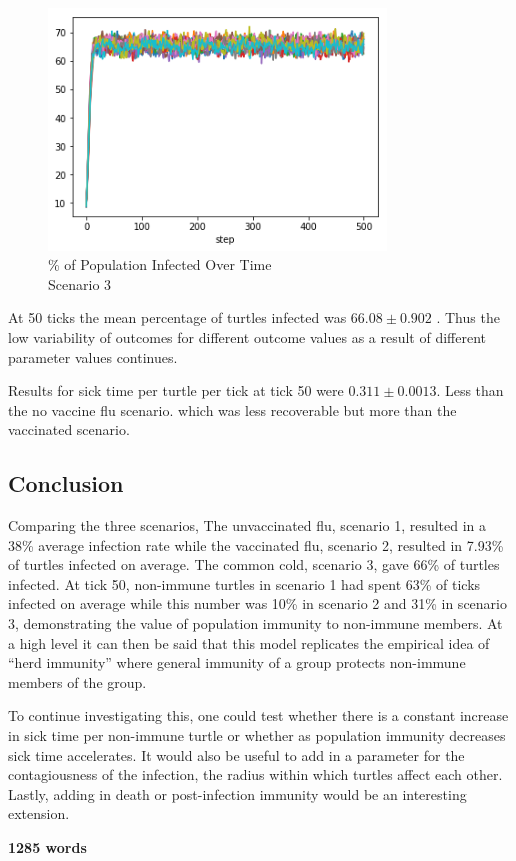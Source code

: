 \documentclass[11pt]{article} %
\begin{document}
\begin{figure}
\centering
\includegraphics[width=0.8\textwidth]{20-runs-scenario-3-steady-state}
\caption{\% of Population Infected Over Time \\ Scenario 3}
\end{figure}


At 50 ticks the mean percentage of turtles infected was $66.08 \pm 0.902$ . Thus the low variability of outcomes for different outcome values as a result of different parameter values continues. 

Results for sick time per turtle per tick at tick 50 were $0.311 \pm 0.0013$. Less than the no vaccine flu scenario. which was less recoverable but more than the vaccinated scenario. 


\subsection{Conclusion}

Comparing the three scenarios, The unvaccinated flu, scenario 1, resulted in a 38\% average infection rate while the vaccinated flu, scenario 2, resulted in 7.93\% of turtles infected on average. The common cold, scenario 3,  gave 66\% of turtles infected. At tick 50, non-immune turtles in scenario 1 had spent 63\% of ticks infected on average while this number was  10\% in scenario 2 and 31\% in scenario 3, demonstrating the value of population immunity to non-immune members.  At a high level it can then be said that this model replicates the empirical idea of ``herd immunity'' where general immunity of a group protects non-immune members of the group. 

To continue investigating this, one could test whether there is a constant increase in sick time per non-immune turtle or whether as population immunity decreases sick time accelerates. It would also be useful to add in a parameter for the contagiousness of the infection, the radius within which turtles affect each other. Lastly, adding in death or post-infection immunity would be an interesting extension. 


\textbf{1285 words}


\nocite{*}


\printbibliography
\end{document}
